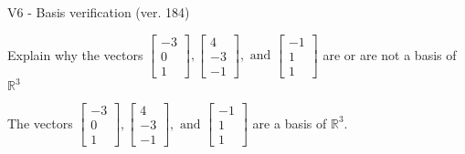 \begin{exercise}
  \begin{exerciseTitle}V6 - Basis verification (ver. 184)\end{exerciseTitle}
  \begin{exerciseStatement}
    Explain why the vectors \(\left[\begin{array}{r}
-3 \\
0 \\
1
\end{array}\right] , \left[\begin{array}{r}
4 \\
-3 \\
-1
\end{array}\right] , \text{ and } \left[\begin{array}{r}
-1 \\
1 \\
1
\end{array}\right]\) are or are not a basis of \(\mathbb{R}^3\)	


  \end{exerciseStatement}
  \begin{exerciseAnswer}
   The vectors \(\left[\begin{array}{r}
-3 \\
0 \\
1
\end{array}\right] , \left[\begin{array}{r}
4 \\
-3 \\
-1
\end{array}\right] , \text{ and } \left[\begin{array}{r}
-1 \\
1 \\
1
\end{array}\right]\) 
  	 are  a basis of \(\mathbb{R}^3\).
  


  \end{exerciseAnswer}
\end{exercise}